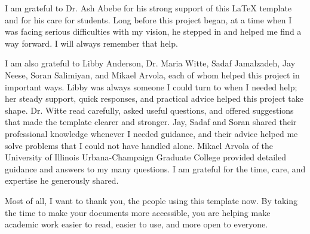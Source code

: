 
I am grateful to Dr. Ash Abebe for his strong support of this \LaTeX{} template and for his care for students. Long before this project began, at a time when I was facing serious difficulties with my vision, he stepped in and helped me find a way forward. I will always remember that help.

I am also grateful to Libby Anderson, Dr. Maria Witte, Sadaf Jamalzadeh, Jay Neese, Soran Salimiyan, and Mikael Arvola, each of whom helped this project in important ways. Libby was always someone I could turn to when I needed help; her steady support, quick responses, and practical advice helped this project take shape. Dr. Witte read carefully, asked useful questions, and offered suggestions that made the template clearer and stronger. Jay, Sadaf and Soran shared their professional knowledge whenever I needed guidance, and their advice helped me solve problems that I could not have handled alone. Mikael Arvola of the University of Illinois Urbana-Champaign Graduate College provided detailed guidance and answers to my many questions. I am grateful for the time, care, and expertise he generously shared.

Most of all, I want to thank you, the people using this template now. By taking the time to make your documents more accessible, you are helping make academic work easier to read, easier to use, and more open to everyone.
